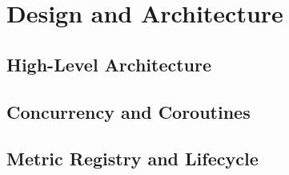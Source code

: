 \chapter{Design and Architecture} \label{ch:architecture}


\section{High-Level Architecture}
\lipsum[1]


\section{Concurrency and Coroutines}
\lipsum[1]


\section{Metric Registry and Lifecycle}
\lipsum[1]